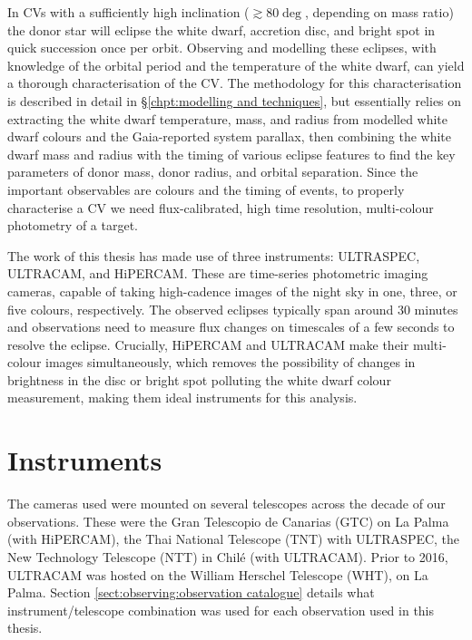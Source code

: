 
\label{chpt:observations and observational techniques} %

In CVs with a sufficiently high inclination ($\gtrsim 80 \deg$, depending on mass ratio) the donor star will eclipse the white dwarf, accretion disc, and bright spot in quick succession once per orbit. Observing and modelling these eclipses, with knowledge of the orbital period and the temperature of the white dwarf, can yield a thorough characterisation of the CV. The methodology for this characterisation is described in detail in \S\ref{chpt:modelling and techniques}, but essentially relies on extracting the white dwarf temperature, mass, and radius from modelled white dwarf colours and the Gaia-reported system parallax, then combining the white dwarf mass and radius with the timing of various eclipse features to find the key parameters of donor mass, donor radius, and orbital separation.
Since the important observables are colours and the timing of events, to properly characterise a CV we need flux-calibrated, high time resolution, multi-colour photometry of a target.

The work of this thesis has made use of three instruments: ULTRASPEC, ULTRACAM, and HiPERCAM.
These are time-series photometric imaging cameras, capable of taking high-cadence images of the night sky in one, three, or five colours, respectively.
The observed eclipses typically span around 30 minutes and observations need to measure flux changes on timescales of a few seconds to resolve the eclipse.
Crucially, HiPERCAM and ULTRACAM make their multi-colour images simultaneously, which removes the possibility of changes in brightness in the disc or bright spot polluting the white dwarf colour measurement, making them ideal instruments for this analysis.


\section{Instruments}
\label{sect:observations:cameras}

The cameras used were mounted on several telescopes across the decade of our observations. These were the Gran Telescopio de Canarias (GTC) on La Palma (with HiPERCAM), the Thai National Telescope (TNT) with ULTRASPEC, the New Technology Telescope (NTT) in Chil\'e (with ULTRACAM). Prior to 2016, ULTRACAM was hosted on the William Herschel Telescope (WHT), on La Palma. Section \ref{sect:observing:observation catalogue} details what instrument/telescope combination was used for each observation used in this thesis.


